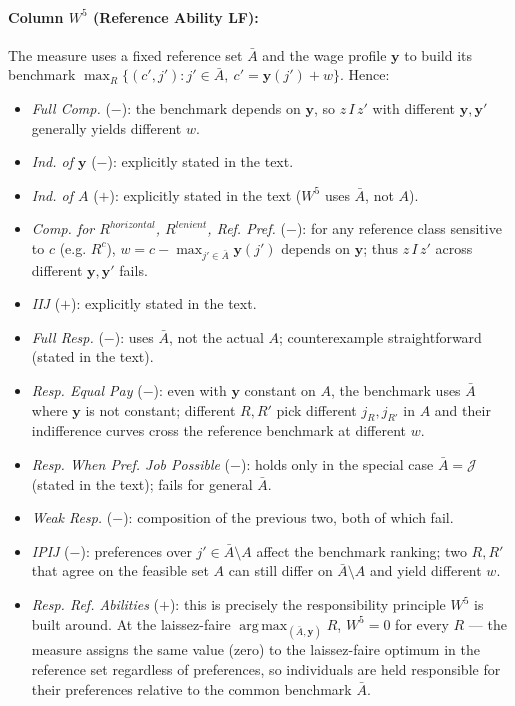 \documentclass[12pt,thmsb]{article}
\DeclareMathOperator*{\argmax}{arg\,max}
\begin{document}
\paragraph{Column $W^5$ (Reference Ability LF):} The measure uses a fixed reference set $\bar A$ and the wage profile $\mathbf y$ to build its benchmark $\max_R\{(c',j'): j'\in\bar A,\ c'=\mathbf y(j')+w\}$. Hence:
\begin{itemize}
    \item \emph{Full Comp.} ($-$): the benchmark depends on $\mathbf y$, so $z\,I\,z'$ with different $\mathbf y,\mathbf y'$ generally yields different $w$.
    \item \emph{Ind. of $\mathbf y$} ($-$): explicitly stated in the text.
    \item \emph{Ind. of $A$} ($+$): explicitly stated in the text ($W^5$ uses $\bar A$, not $A$).
    \item \emph{Comp. for $R^{horizontal}$, $R^{lenient}$, Ref. Pref.} ($-$): for any reference class sensitive to $c$ (e.g. $R^c$), $w = c - \max_{j'\in\bar A}\mathbf y(j')$ depends on $\mathbf y$; thus $z\,I\,z'$ across different $\mathbf y,\mathbf y'$ fails.
    \item \emph{IIJ} ($+$): explicitly stated in the text.
    \item \emph{Full Resp.} ($-$): uses $\bar A$, not the actual $A$; counterexample straightforward (stated in the text).
    \item \emph{Resp. Equal Pay} ($-$): even with $\mathbf y$ constant on $A$, the benchmark uses $\bar A$ where $\mathbf y$ is not constant; different $R,R'$ pick different $j_R,j_{R'}$ in $A$ and their indifference curves cross the reference benchmark at different $w$.
    \item \emph{Resp. When Pref. Job Possible} ($-$): holds only in the special case $\bar A=\mathcal J$ (stated in the text); fails for general $\bar A$.
    \item \emph{Weak Resp.} ($-$): composition of the previous two, both of which fail.
    \item \emph{IPIJ} ($-$): preferences over $j'\in\bar A\setminus A$ affect the benchmark ranking; two $R,R'$ that agree on the feasible set $A$ can still differ on $\bar A\setminus A$ and yield different $w$.
    \item \emph{Resp. Ref. Abilities} ($+$): this is precisely the responsibility principle $W^5$ is built around. At the laissez-faire $\argmax_{(\bar A,\mathbf y)}R$, $W^5=0$ for every $R$ --- the measure assigns the same value (zero) to the laissez-faire optimum in the reference set regardless of preferences, so individuals are held responsible for their preferences relative to the common benchmark $\bar A$.
\end{itemize}
\end{document}
